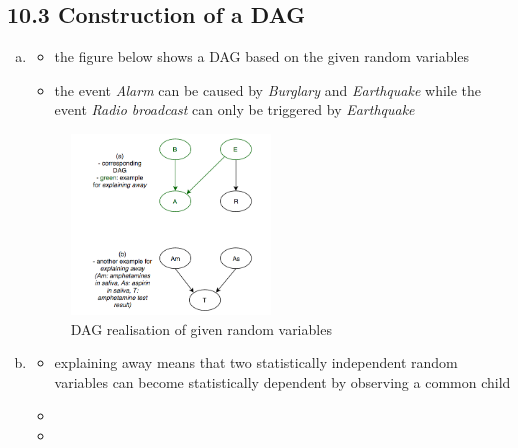 \documentclass[10pt,a4paper]{article}
\begin{document}
\subsection*{10.3 Construction of a DAG}
\begin{enumerate}[a)]
\item

\begin{itemize}
	\item the figure below shows a DAG based on the given random variables
	\item the event \textit{Alarm} can be caused by \textit{Burglary} and \textit{Earthquake} while the event \textit{Radio broadcast} can only be triggered by \textit{Earthquake}
\end{itemize}

	\begin{figure}[h]
  	\centering
    \includegraphics[width=0.5\textwidth]{103.png}
		\caption{DAG realisation of given random variables}
	\end{figure}

\item

		\begin{itemize}
			\item explaining away means that two statistically independent random variables can become statistically dependent by observing a common child
			\item
			\item
		\end{itemize}


\end{enumerate}

\end{document}
